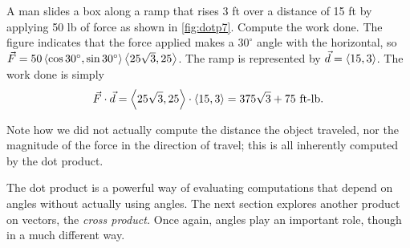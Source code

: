 \begin{example}\label{ex_dotp7}%
A man slides a box along a ramp that rises 3 ft over a distance of 15 ft by applying 50 lb of force as shown in \autoref{fig:dotp7}. Compute the work done.
\solution
The figure indicates that the force applied makes a $30^\circ$ angle with the horizontal, so $\vec F = 50\bracket{\cos 30^\circ,\sin 30^\circ}\bracket{25\sqrt3,25}%
$. The ramp is represented by $\vec d  =\left\langle 15,3\right\rangle$. The work done is simply
\[\vec F\cdot\vec d = \bracket{25\sqrt3,25}\cdot\bracket{15,3}=375\sqrt3+75%
\text{ ft-lb}.\]

Note how we did not actually compute the distance the object traveled, nor the magnitude of the force in the direction of travel; this is all inherently computed by the dot product.
\end{example}

The dot product is a powerful way of evaluating computations that depend on angles without actually using angles. The next section explores another product on vectors, the \emph{cross product.} Once again, angles play an important role, though in a much different way.

